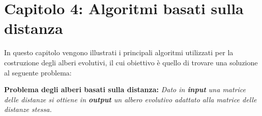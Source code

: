 \chapter{Capitolo 4: Algoritmi basati sulla distanza}
In questo capitolo vengono illustrati i principali algoritmi utilizzati per la costruzione degli alberi evolutivi, il cui obiettivo è quello di trovare una soluzione al seguente problema:
\begin{center}
\textbf{Problema degli alberi basati sulla distanza:}
\newline
\textit{Dato in \textbf{input} una matrice delle distanze si ottiene in \textbf{output} un albero evolutivo adattato alla matrice delle distanze stessa.}
\end{center}